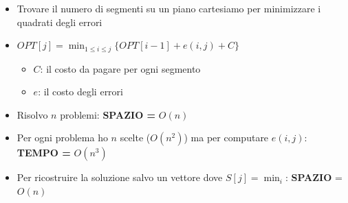 \begin{itemize}
  \item Trovare il numero di segmenti su un piano cartesiamo per minimizzare i
        quadrati degli errori
  \item $OPT[j] = \min_{1 \le i \le j} \{ OPT[i-1] + e(i,j) + C \}$

        \begin{itemize}
          \item $C$: il costo da pagare per ogni segmento
          \item $e$: il costo degli errori
        \end{itemize}
  \item Risolvo $n$ problemi: \textbf{SPAZIO =} $O(n)$
  \item Per ogni problema ho $n$ scelte ($O(n^2)$) ma per computare
        $e(i,j)$: \textbf{TEMPO =} $O(n^3)$
  \item Per ricostruire la soluzione salvo un vettore dove $S[j] = \min_i$:
        \textbf{SPAZIO} = $O(n)$
\end{itemize}

